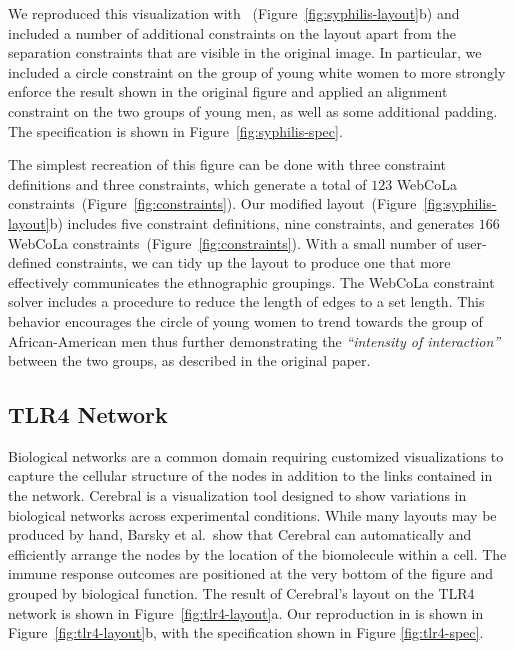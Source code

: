 

We reproduced this visualization with \projectname~(Figure~\ref{fig:syphilis-layout}b) 
and included a number of additional constraints on the layout apart
from the separation constraints that are visible in the original image. In
particular, we included a circle constraint on the group of young white
women to more strongly enforce the result shown in the original figure and
applied an alignment constraint on the two groups of young
men, as well as some additional padding. The \projectname specification
is shown in Figure~\ref{fig:syphilis-spec}.

The simplest recreation of this figure can be done with three constraint
definitions and three \projectname constraints, which generate a total of
$123$ WebCoLa constraints~(Figure~\ref{fig:constraints}).
Our modified layout~(Figure~\ref{fig:syphilis-layout}b) includes 
five constraint definitions, nine \projectname constraints, and generates 
$166$ WebCoLa constraints~(Figure~\ref{fig:constraints}). With a small 
number of user-defined constraints, we can tidy up the layout to produce
one that more effectively communicates the ethnographic groupings. The
WebCoLa constraint solver includes a procedure to reduce the length of
edges to a set length. This behavior encourages the circle of young women
to trend towards the group of African-American men thus further demonstrating
the \emph{``intensity of interaction''} between the two groups, as described in
the original paper.


\subsection{TLR4 Network}
\tlrfourSpec

Biological networks are a common domain requiring customized visualizations
to capture the cellular structure of the nodes in addition to the links
contained in the network. Cerebral \cite{barsky2008cerebral} is a visualization
tool designed to show variations in biological networks across experimental
conditions. While many layouts may be produced by hand, Barsky et al.\ show that 
Cerebral can automatically and efficiently arrange the nodes by the location
of the biomolecule within a cell. The immune response outcomes are positioned
at the very bottom of the figure and grouped by biological function. The result
of Cerebral's layout on the TLR4 network is shown in Figure~\ref{fig:tlr4-layout}a.
Our reproduction in \projectname is shown in Figure~\ref{fig:tlr4-layout}b,
with the specification shown in Figure \ref{fig:tlr4-spec}.

